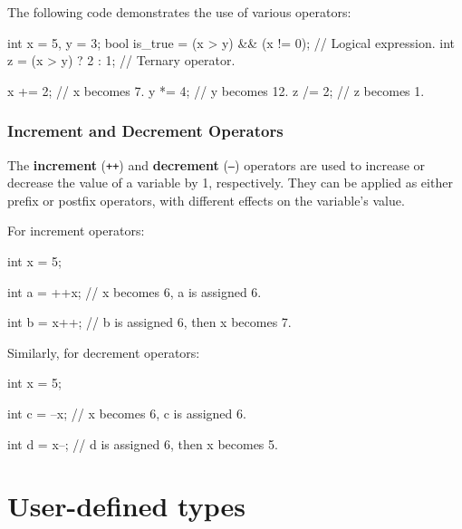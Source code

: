 \vspace{0.5em}

\begin{exampleblock}
The following code demonstrates the use of various operators:
\vspace{-0.5em}
\begin{codeblock}[language=C++, numbers=none]
int x = 5, y = 3;
bool is_true = (x > y) && (x != 0); // Logical expression.
int z = (x > y) ? 2 : 1;            // Ternary operator.

x += 2; // x becomes 7.
y *= 4; // y becomes 12.
z /= 2; // z becomes 1.
\end{codeblock}
\end{exampleblock}

\subsubsection{Increment and Decrement Operators}

The \textbf{increment} (\texttt{++}) and \textbf{decrement} (\texttt{--}) operators are used to increase or decrease the value of a variable by 1, respectively. They can be applied as either prefix or postfix operators, with different effects on the variable's value.

For increment operators:

\begin{codeblock}[language=C++, numbers=none]
int x = 5;

int a = ++x; // x becomes 6, a is assigned 6.

int b = x++; // b is assigned 6, then x becomes 7.
\end{codeblock}

Similarly, for decrement operators:

\begin{codeblock}[language=C++, numbers=none]
int x = 5;

int c = --x; // x becomes 6, c is assigned 6.

int d = x--; // d is assigned 6, then x becomes 5.
\end{codeblock}

\section{User-defined types}

